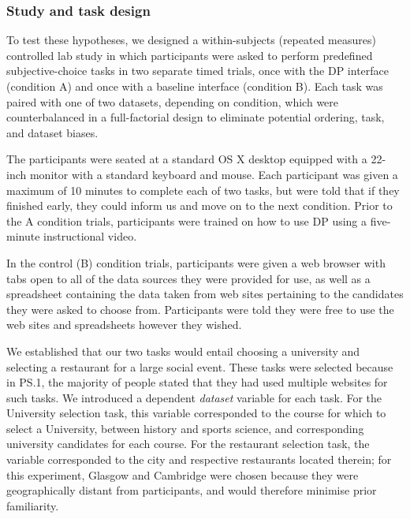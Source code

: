 \documentclass{sigchi}
\begin{document}
\subsubsection{Study and task design}
To test these hypotheses, we designed a within-subjects (repeated measures) controlled lab study in which participants were asked to perform predefined subjective-choice tasks in two separate timed trials, once with the DP interface (condition A) and once with a baseline interface (condition B).  Each task was paired with one of two datasets, depending on condition, which were counterbalanced in a full-factorial design to eliminate potential ordering, task, and dataset biases.

The participants were seated at a standard OS X desktop equipped with a 22-inch monitor with a standard keyboard and mouse. Each participant was given a maximum of 10 minutes to complete each of two tasks, but were told that if they finished early, they could inform us and move on to the next condition.  Prior to the A condition trials, participants were trained on how to use DP using a five-minute instructional video.

In the control (B) condition trials, participants were given a web browser with tabs open to all of the data sources they were provided for use, as well as a spreadsheet containing the data taken from web sites pertaining to the candidates they were asked to choose from. Participants were told they were free to use the web sites and spreadsheets however they wished. 


We established that our two tasks would entail choosing a university and selecting a restaurant for a large social event.  These tasks were selected because in PS.1, the majority of people stated that they had used multiple websites for such tasks.  We introduced a dependent \emph{dataset} variable for each task.  For the University selection task, this variable corresponded to the course for which to select a University, between history and sports science, and corresponding university candidates for each course.  For the restaurant selection task, the variable corresponded to the city and respective restaurants located therein; for this experiment, Glasgow and Cambridge were chosen because they were geographically distant from participants, and would therefore minimise prior familiarity.  
\end{document}

